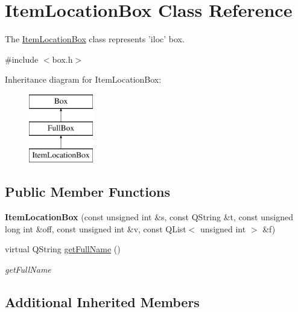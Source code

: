 \hypertarget{class_item_location_box}{\section{Item\-Location\-Box Class Reference}
\label{class_item_location_box}
}


The \hyperlink{class_item_location_box}{Item\-Location\-Box} class represents 'iloc' box.  




{\ttfamily \#include $<$box.\-h$>$}

Inheritance diagram for Item\-Location\-Box\-:\begin{figure}[H]
\begin{center}
\leavevmode
\includegraphics[height=3.000000cm]{class_item_location_box}
\end{center}
\end{figure}
\subsection*{Public Member Functions}
\begin{DoxyCompactItemize}
\item 
\hypertarget{class_item_location_box_ac474e27389e8141b00ea61cd1a5f9d1b}{{\bfseries Item\-Location\-Box} (const unsigned int \&s, const Q\-String \&t, const unsigned long int \&off, const unsigned int \&v, const Q\-List$<$ unsigned int $>$ \&f)}\label{class_item_location_box_ac474e27389e8141b00ea61cd1a5f9d1b}

\item 
virtual Q\-String \hyperlink{class_item_location_box_a88ae4bd69cdcc39a4f54b894631c12fe}{get\-Full\-Name} ()
\begin{DoxyCompactList}\small\item\em get\-Full\-Name \end{DoxyCompactList}\end{DoxyCompactItemize}
\subsection*{Additional Inherited Members}



